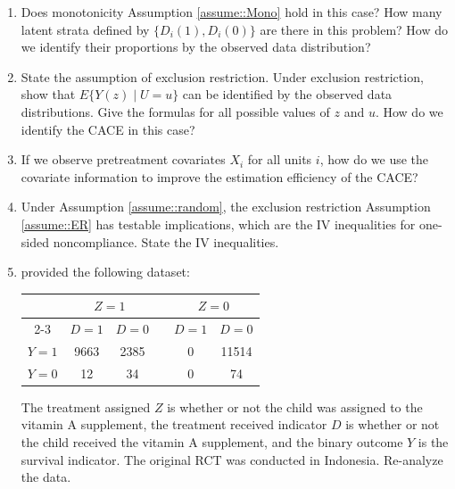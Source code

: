  
\begin{enumerate}
[(1)]
\item 
Does monotonicity Assumption \ref{assume::Mono} hold in this case? 
How many latent strata defined by $\{ D_i(1), D_i(0)  \}$ are there in this problem? How do we identify their proportions by the observed data distribution?  

\item 
State the assumption of exclusion restriction. Under exclusion restriction, show that $E\{  Y(z) \mid U = u \}$ can be identified by the observed data distributions.
Give the formulas for all possible values of $z$ and $u$. How do we identify the CACE in this case?  

 

\item
If we observe pretreatment covariates $X_i$ for all units $i$, how do we use the covariate information to improve the estimation efficiency of the CACE?  
 
 
 \item 
 Under Assumption \ref{assume::random}, the exclusion restriction Assumption \ref{assume::ER} has testable implications, which are the IV inequalities for one-sided noncompliance. State the IV inequalities.
 
\item
\citet{sommer1991estimating} provided the following dataset: 
 
 \begin{center}
\begin{tabular}{cccccc} 
\hline 
      &   \multicolumn{2}{c}{$Z=1$}  &  &  \multicolumn{2}{c}{$Z=0$}  \\  \cline{2-3} \cline{5-6} 
      & $D=1$  &  $D=0$           &       &  $D=1$  &  $D=0$\\
 $Y=1$ &   9663    &     2385         &      &     0       &    11514       \\
 $Y=0$ &   12   &     34            &      &     0         &    74           \\  
 \hline 
\end{tabular}
 \end{center}
 
The treatment assigned $Z$ is whether or not the child was assigned to the vitamin A supplement, the treatment received indicator $D$ is whether or not the child received the vitamin A supplement, and the binary outcome $Y$ is the survival indicator. The original RCT was conducted in Indonesia. 
Re-analyze the data. 
 \end{enumerate}
 

